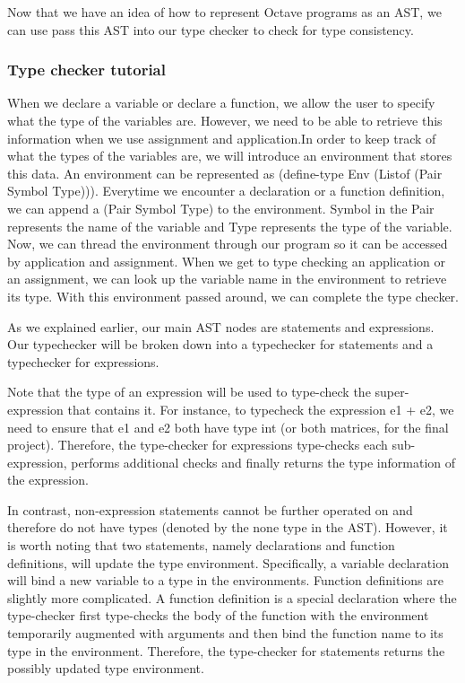 Now that we have an idea of how to represent Octave programs as an AST, we can use pass this AST into our type checker to check for type consistency. 

\subsubsection{Type checker tutorial}
When we declare a variable or declare a function, we allow the user to specify what the type of the variables are. However, we need to be able to retrieve this information when we use assignment and application.In order to keep track of what the types of the variables are, we will introduce an environment that stores this data. An environment can be represented as (define-type Env (Listof (Pair Symbol Type))). Everytime we encounter a declaration or a function definition, we can append a (Pair Symbol Type) to the environment. 
Symbol in the Pair represents the name of the variable and Type represents the type of the variable. Now, we can thread the environment through our program so it can be accessed by application and assignment. When we get to type checking an application or an assignment, we can look up the variable name in the environment to retrieve its type. With this environment passed around, we can complete the type checker. 

As we explained earlier, our main AST nodes are statements and expressions. Our typechecker will be broken down into a typechecker for statements and a typechecker for expressions.

Note that the type of an expression will be used to type-check the super-expression that contains it. For instance, to typecheck the expression e1 + e2, we need to ensure that e1 and e2 both have type int (or both matrices, for the final project). Therefore, the type-checker for expressions type-checks each sub-expression, performs additional checks and finally returns the type information of the expression.

In contrast, non-expression statements cannot be further operated on and therefore do not have types (denoted by the none type in the AST). However, it is worth noting that two statements, namely declarations and function definitions, will update the type environment. Specifically, a variable declaration will bind a new variable to a type in the environments. Function definitions are slightly more complicated. A function definition is a special declaration where the type-checker first type-checks the body of the function with the environment temporarily augmented with arguments and then bind the function name to its type in the environment. Therefore, the type-checker for statements returns the possibly updated type environment.

